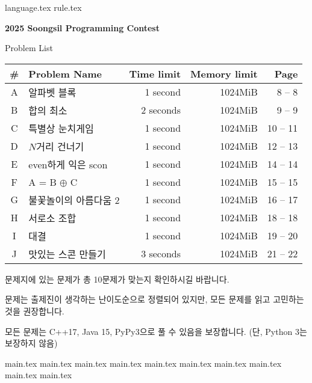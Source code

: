 \documentclass[11pt,a4paper,oneside]{article}
\begin{document}
    
%
    {language.tex} \pagebreak
    {rule.tex} \pagebreak
%
    \begin{center}
    
    \vspace*{15mm}
    {
        \Huge
        \textbf{2025 Soongsil Programming Contest}
        
        \vspace{25mm}
        Problem List
        \vspace{10mm}
    }
    
    \begin{tabular}{|c|l|r|r|r|}
    \hline
    \# & Problem Name & Time limit & Memory limit & Page \\ \hline
        A & 알파벳 블록 & 1 second\phantom{s} & 1024MiB & \phantom{0}8 -- \phantom{0}8 \\ \hline
        B & 합의 최소 & 2 seconds & 1024MiB & \phantom{0}9 -- \phantom{0}9 \\ \hline
        C & 특별상 눈치게임 & 1 second\phantom{s} & 1024MiB & 10 -- 11 \\ \hline
        D & $N$거리 건너기 & 1 second\phantom{s} & 1024MiB & 12 -- 13 \\ \hline
        E & even하게 익은 scon & 1 second\phantom{s} & 1024MiB & 14 -- 14 \\ \hline
        F & A = B $\oplus$ C & 1 second\phantom{s} & 1024MiB & 15 -- 15 \\ \hline
        G & 불꽃놀이의 아름다움 2 & 1 second\phantom{s} & 1024MiB & 16 -- 17 \\ \hline
        H & 서로소 조합 & 1 second\phantom{s} & 1024MiB & 18 -- 18 \\ \hline
        I & 대결 & 1 second\phantom{s} & 1024MiB & 19 -- 20 \\ \hline
        J & 맛있는 스콘 만들기 & 3 seconds & 1024MiB & 21 -- 22 \\ \hline
    \end{tabular}

    \vspace{5mm}
    
    문제지에 있는 문제가 총 10문제가 맞는지 확인하시길 바랍니다.

    문제는 출제진이 생각하는 난이도순으로 정렬되어 있지만, 모든 문제를 읽고 고민하는 것을 권장합니다.

    모든 문제는 C++17, Java 15, PyPy3으로 풀 수 있음을 보장합니다. (단, Python 3는 보장하지 않음)
    
    \end{center}
    	
    \pagebreak

    {main.tex} \pagebreak
    {main.tex} \pagebreak
    {main.tex} \pagebreak
    {main.tex} \pagebreak
    {main.tex} \pagebreak
    {main.tex} \pagebreak
    {main.tex} \pagebreak
    {main.tex} \pagebreak
    {main.tex} \pagebreak
    {main.tex} \pagebreak
    
\end{document}
